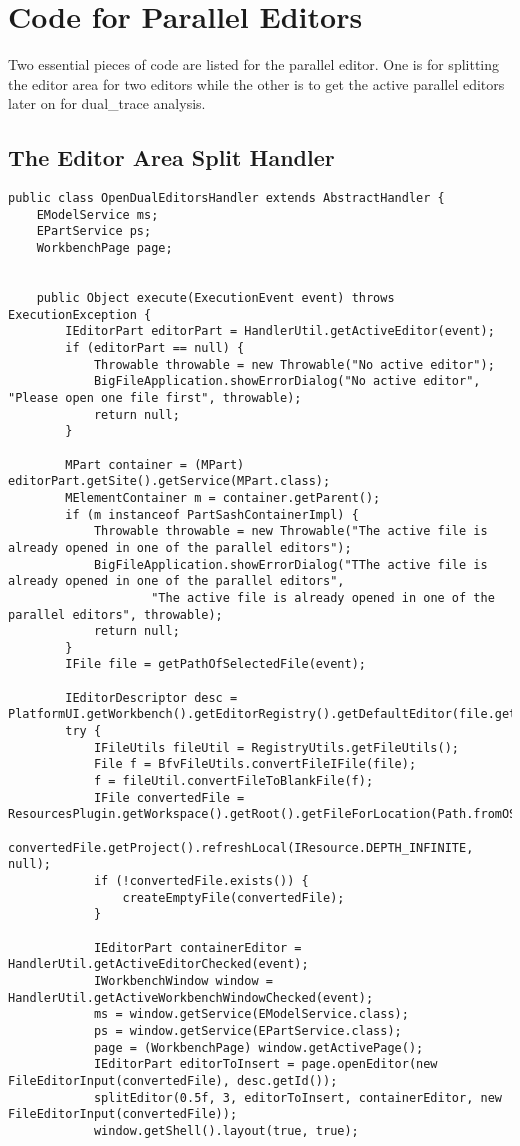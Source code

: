 \section{Code for Parallel Editors}\label{paralleleditor}
Two essential pieces of code are listed for the parallel editor. One is for splitting the editor area for two editors while the other is to get the active parallel editors later on  for dual\_trace analysis.
\subsection{The Editor Area Split Handler}
\begin{lstlisting}[caption= code in OpenDualEditorsHandler.java]
public class OpenDualEditorsHandler extends AbstractHandler {
	EModelService ms;
	EPartService ps;
	WorkbenchPage page;

	  
    public Object execute(ExecutionEvent event) throws ExecutionException {
		IEditorPart editorPart = HandlerUtil.getActiveEditor(event);
		if (editorPart == null) {
			Throwable throwable = new Throwable("No active editor");
			BigFileApplication.showErrorDialog("No active editor", "Please open one file first", throwable);
			return null;
		}

		MPart container = (MPart) editorPart.getSite().getService(MPart.class);
		MElementContainer m = container.getParent();
		if (m instanceof PartSashContainerImpl) {
			Throwable throwable = new Throwable("The active file is already opened in one of the parallel editors");
			BigFileApplication.showErrorDialog("TThe active file is already opened in one of the parallel editors",
					"The active file is already opened in one of the parallel editors", throwable);
			return null;
		}
		IFile file = getPathOfSelectedFile(event);

		IEditorDescriptor desc = PlatformUI.getWorkbench().getEditorRegistry().getDefaultEditor(file.getName());
		try {
			IFileUtils fileUtil = RegistryUtils.getFileUtils();
			File f = BfvFileUtils.convertFileIFile(file);
			f = fileUtil.convertFileToBlankFile(f);
			IFile convertedFile = ResourcesPlugin.getWorkspace().getRoot().getFileForLocation(Path.fromOSString(f.getAbsolutePath()));
			convertedFile.getProject().refreshLocal(IResource.DEPTH_INFINITE, null);
			if (!convertedFile.exists()) {
				createEmptyFile(convertedFile);
			}

			IEditorPart containerEditor = HandlerUtil.getActiveEditorChecked(event);
			IWorkbenchWindow window = HandlerUtil.getActiveWorkbenchWindowChecked(event);
			ms = window.getService(EModelService.class);
			ps = window.getService(EPartService.class);
			page = (WorkbenchPage) window.getActivePage();
			IEditorPart editorToInsert = page.openEditor(new FileEditorInput(convertedFile), desc.getId());
			splitEditor(0.5f, 3, editorToInsert, containerEditor, new FileEditorInput(convertedFile));
			window.getShell().layout(true, true);
			


\end{lstlisting}
